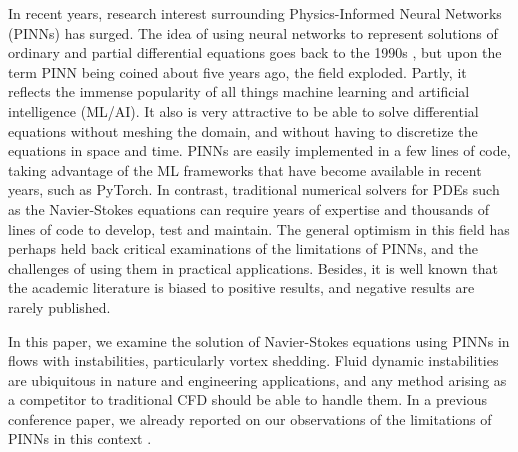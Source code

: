 
In recent years, research interest surrounding Physics-Informed Neural Networks (PINNs) has surged.
The idea of using neural networks to represent solutions of ordinary and partial differential equations goes back to the 1990s \cite{dissanayake_neural-network-based_1994,lagaris_artificial_1998}, but upon the term PINN being coined about five years ago, the field exploded. 
Partly, it reflects the immense popularity of all things machine learning and artificial intelligence (ML/AI). 
It also is very attractive to be able to solve differential equations without meshing the domain, and without having to discretize the equations in space and time. 
PINNs are easily implemented in a few lines of code, taking advantage of the ML frameworks that have become available in recent years, such as PyTorch. 
In contrast, traditional numerical solvers for PDEs such as the Navier-Stokes equations can require years of expertise and thousands of lines of code to develop, test and maintain. 
The general optimism in this field has perhaps held back critical examinations of the limitations of PINNs, and the challenges of using them in practical applications. 
Besides, it is well known that the academic literature is biased to positive results, and negative results are rarely published. 

In this paper, we examine the solution of Navier-Stokes equations using PINNs in flows with instabilities, particularly vortex shedding. 
Fluid dynamic instabilities are ubiquitous in nature and engineering applications, and any method arising as a competitor to traditional CFD should be able to handle them. 
In a previous conference paper, we already reported on our observations of the limitations of PINNs in this context \cite{chuang_predicting_2020}.